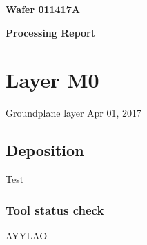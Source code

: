 \documentclass{article}%
\begin{document}
%
\normalsize%
\pagestyle{header}%
\begin{minipage}{\textwidth}%
\centering%
\begin{Large}%
\textbf{Wafer 011417A}%
\end{Large}%
\linebreak%
\begin{large}%
\textbf{Processing Report}%
\end{large}%
\end{minipage}%
\section{Layer M0}%
Groundplane layer%
Apr 01, 2017%
\subsection{Deposition}%
Test%
\subsubsection{Tool status check}%
AYYLAO

%
\end{document}
